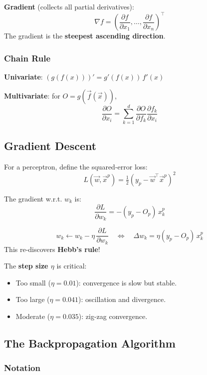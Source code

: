 \documentclass[11pt,a4paper]{article}
\newcommand{\vx}{\vec{x}}
\begin{document}
\textbf{Gradient} (collects all partial derivatives):
\[
\nabla f = \left(\frac{\partial f}{\partial x_1}, \ldots, \frac{\partial f}{\partial x_n}\right)^\top
\]
The gradient is the \textbf{steepest ascending direction}.

\subsubsection{Chain Rule}

\textbf{Univariate}: $(g(f(x)))' = g'(f(x))\, f'(x)$

\textbf{Multivariate}: for $O = g(\vec{f}(\vx))$,
\[
\frac{\partial O}{\partial x_i} = \sum_{k=1}^d \frac{\partial O}{\partial f_k}\frac{\partial f_k}{\partial x_i}
\]

\subsection{Gradient Descent}

For a perceptron, define the squared-error loss:
\[
L(\vec{w}, \vx^p) = \tfrac{1}{2}(y_p - \vec{w}^\top \vx^p)^2
\]

The gradient w.r.t. $w_k$ is:
\[
\frac{\partial L}{\partial w_k} = -(y_p - O_p)\, x_k^p
\]

\begin{keybox}[title=Gradient Descent Update]
\[
w_k \leftarrow w_k - \eta\, \frac{\partial L}{\partial w_k}
\quad\Longleftrightarrow\quad
\Delta w_k = \eta(y_p - O_p)\, x_k^p
\]
This re-discovers \textbf{Hebb's rule}!
\end{keybox}

The \textbf{step size $\eta$} is critical:
\begin{itemize}[leftmargin=*]
    \item Too small ($\eta = 0.01$): convergence is slow but stable.
    \item Too large ($\eta = 0.041$): oscillation and divergence.
    \item Moderate ($\eta = 0.035$): zig-zag convergence.
\end{itemize}

\subsection{The Backpropagation Algorithm}

\subsubsection{Notation}
\end{document}
